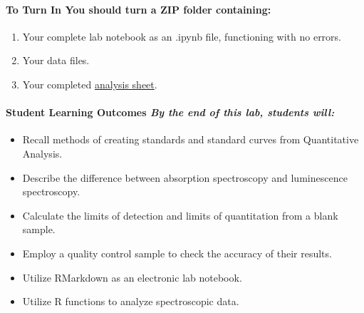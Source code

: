 \documentclass[]{tufte-book}
\providecommand{\tightlist}{%
  \setlength{\itemsep}{0pt}\setlength{\parskip}{0pt}}
\begin{document}
\hypertarget{to-turn-in-you-should-turn-a-zip-folder-containing}{%
\paragraph{\texorpdfstring{\textbf{To Turn In} \textbar{} You should turn a ZIP folder containing:}{To Turn In \textbar{} You should turn a ZIP folder containing:}}\label{to-turn-in-you-should-turn-a-zip-folder-containing}}

\begin{enumerate}
\def\labelenumi{\arabic{enumi}.}
\tightlist
\item
  Your complete lab notebook as an .ipynb file, functioning with no errors.\\
\item
  Your data files.\\
\item
  Your completed \href{https://github.com/alphonse/alphonse.github.io/raw/master/chem370/assignments/excel-templates/lab1_uv-vis_data-analysis.xlsx}{analysis sheet}.
\end{enumerate}

\hypertarget{student-learning-outcomes-by-the-end-of-this-lab-students-will}{%
\paragraph{\texorpdfstring{\textbf{Student Learning Outcomes} \textbar{} \emph{By the end of this lab, students will:}}{Student Learning Outcomes \textbar{} By the end of this lab, students will:}}\label{student-learning-outcomes-by-the-end-of-this-lab-students-will}}

\begin{itemize}
\tightlist
\item
  Recall methods of creating standards and standard curves from Quantitative Analysis.\\
\item
  Describe the difference between absorption spectroscopy and luminescence spectroscopy.
\item
  Calculate the limits of detection and limits of quantitation from a blank sample.
\item
  Employ a quality control sample to check the accuracy of their results.
\item
  Utilize RMarkdown as an electronic lab notebook.
\item
  Utilize R functions to analyze spectroscopic data.
\end{itemize}
\end{document}
